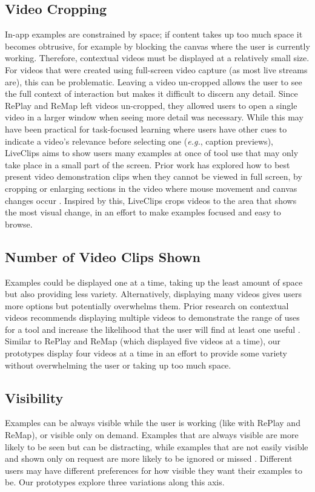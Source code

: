 \subsection{Video Cropping}
In-app examples are constrained by space; if content takes up too much space it becomes obtrusive, for example by blocking the canvas where the user is currently working. Therefore, contextual videos must be displayed at a relatively small size. For videos that were created using full-screen video capture (as most live streams are), this can be problematic. Leaving a video un-cropped allows the user to see the full context of interaction but makes it difficult to discern any detail. Since RePlay and ReMap left videos un-cropped, they allowed users to open a single video in a larger window when seeing more detail was necessary. While this may have been practical for task-focused learning where users have other cues to indicate a video's relevance before selecting one (\textit{e.g.}, caption previews), LiveClips aims to show users many examples at once of tool use that may only take place in a small part of the screen. Prior work has explored how to best present video demonstration clips when they cannot be viewed in full screen, by cropping or enlarging sections in the video where mouse movement and canvas changes occur \cite{Chi2012}. Inspired by this, LiveClips crops videos to the area that shows the most visual change, in an effort to make examples focused and easy to browse.

\subsection{Number of Video Clips Shown}
Examples could be displayed one at a time, taking up the least amount of space but also providing less variety. Alternatively, displaying many videos gives users more options but potentially overwhelms them. Prior research on contextual videos recommends displaying multiple videos to demonstrate the range of uses for a tool and increase the likelihood that the user will find at least one useful \cite{Lafreniere2014, Matejka2011}. Similar to RePlay and ReMap (which displayed five videos at a time), our prototypes display four videos at a time in an effort to provide some variety without overwhelming the user or taking up too much space.

\subsection{Visibility}
Examples can be always visible while the user is working (like with RePlay and ReMap), or visible only on demand. Examples that are always visible are more likely to be seen but can be distracting, while examples that are not easily visible and shown only on request are more likely to be ignored or missed \cite{Rhodes1996}. Different users may have different preferences for how visible they want their examples to be. Our prototypes explore three variations along this axis.

